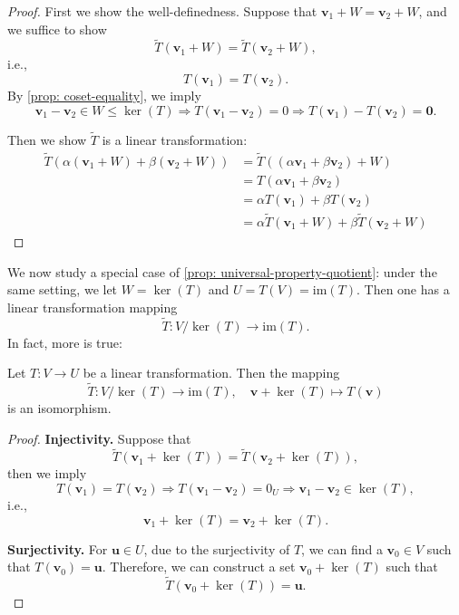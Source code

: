 \begin{proof}
First we show the well-definedness. Suppose that \( \mathbf{v}_1 + W = \mathbf{v}_2 + W \), and we suffice to show 
\[
\widetilde{T}(\mathbf{v}_1 + W) = \widetilde{T}(\mathbf{v}_2 + W),
\]
i.e., 
\[
T(\mathbf{v}_1) = T(\mathbf{v}_2).
\]
By \autoref{prop: coset-equality}, we imply
\[
\mathbf{v}_1 - \mathbf{v}_2 \in W \leq \ker(T) \Rightarrow T(\mathbf{v}_1 - \mathbf{v}_2) = 0 \Rightarrow T(\mathbf{v}_1) - T(\mathbf{v}_2) = \mathbf{0}.
\]

Then we show \( \widetilde{T} \) is a linear transformation:
\begin{align*}
\widetilde{T}(\alpha(\mathbf{v}_1 + W) + \beta(\mathbf{v}_2 + W)) 
&= \widetilde{T}((\alpha \mathbf{v}_1 + \beta \mathbf{v}_2) + W) \\
&= T(\alpha \mathbf{v}_1 + \beta \mathbf{v}_2) \\
&= \alpha T(\mathbf{v}_1) + \beta T(\mathbf{v}_2) \\
&= \alpha \widetilde{T}(\mathbf{v}_1 + W) + \beta \widetilde{T}(\mathbf{v}_2 + W)
\end{align*}
\end{proof}

We now study a special case of \autoref{prop: universal-property-quotient}: under the same setting, we let
\( W = \ker(T) \) and $U = T(V) = \mathrm{im}(T)$.
Then one has a linear transformation mapping 
\[
\widetilde{T}: V/\ker{(T)} \to \mathrm{im}(T).
\]
In fact, more is true:
\begin{theorem}\label{thm: first-isomorphism}
Let \( T: V \to U \) be a linear transformation. Then the mapping
\[
\widetilde{T}: V/\ker(T) \to \mathrm{im}(T), \quad \mathbf{v} + \ker(T) \mapsto T(\mathbf{v})
\]
is an isomorphism.
\end{theorem}

\begin{proof}
\textbf{Injectivity.} Suppose that 
\[
\widetilde{T}(\mathbf{v}_1 + \ker(T)) = \widetilde{T}(\mathbf{v}_2 + \ker(T)),
\]
then we imply
\[
T(\mathbf{v}_1) = T(\mathbf{v}_2) \Rightarrow T(\mathbf{v}_1 - \mathbf{v}_2) = 0_U \Rightarrow \mathbf{v}_1 - \mathbf{v}_2 \in \ker(T),
\]
i.e., 
\[
\mathbf{v}_1 + \ker(T) = \mathbf{v}_2 + \ker(T).
\]

\textbf{Surjectivity.} For \( \mathbf{u} \in U \), due to the surjectivity of \( T \), we can find a \( \mathbf{v}_0 \in V \) such that \( T(\mathbf{v}_0) = \mathbf{u} \). Therefore, we can construct a set \( \mathbf{v}_0 + \ker(T) \) such that
\[
\widetilde{T}(\mathbf{v}_0 + \ker(T)) = \mathbf{u}.
\]
\end{proof}

